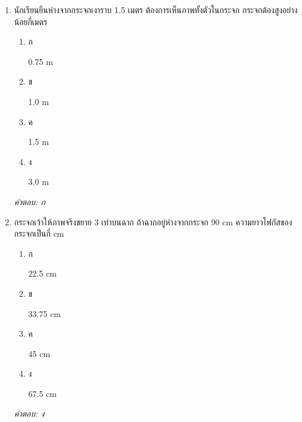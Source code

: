 \documentclass[12pt]{article}
\begin{document}
\begin{enumerate}[label=\arabic*., itemsep=0.5\baselineskip, topsep=0.5\baselineskip, leftmargin=*]
\item นักเรียนยืนห่างจากกระจกเงาราบ 1.5 เมตร ต้องการเห็นภาพทั้งตัวในกระจก กระจกต้องสูงอย่างน้อยกี่เมตร
\begin{enumerate}[label=\alph*)., itemsep=0.3\baselineskip, topsep=0.3\baselineskip]
\item ก\ 
\begin{minipage}[t]{0.9\linewidth}
\raggedright 0.75 m
\end{minipage}
\item ข\ 
\begin{minipage}[t]{0.9\linewidth}
\raggedright 1.0 m
\end{minipage}
\item ค\ 
\begin{minipage}[t]{0.9\linewidth}
\raggedright 1.5 m
\end{minipage}
\item ง\ 
\begin{minipage}[t]{0.9\linewidth}
\raggedright 3.0 m
\end{minipage}
\end{enumerate}
\vspace{-0.3\baselineskip}
\begin{small}
\textit{คำตอบ: ก}
\end{small}

\item กระจกเว้าให้ภาพจริงขยาย 3 เท่าบนฉาก ถ้าฉากอยู่ห่างจากกระจก 90 cm ความยาวโฟกัสของกระจกเป็นกี่ cm
\begin{enumerate}[label=\alph*)., itemsep=0.3\baselineskip, topsep=0.3\baselineskip]
\item ก\ 
\begin{minipage}[t]{0.9\linewidth}
\raggedright 22.5 cm
\end{minipage}
\item ข\ 
\begin{minipage}[t]{0.9\linewidth}
\raggedright 33.75 cm
\end{minipage}
\item ค\ 
\begin{minipage}[t]{0.9\linewidth}
\raggedright 45 cm
\end{minipage}
\item ง\ 
\begin{minipage}[t]{0.9\linewidth}
\raggedright 67.5 cm
\end{minipage}
\end{enumerate}
\vspace{-0.3\baselineskip}
\begin{small}
\textit{คำตอบ: ง}
\end{small}


\end{enumerate}
\end{document}
